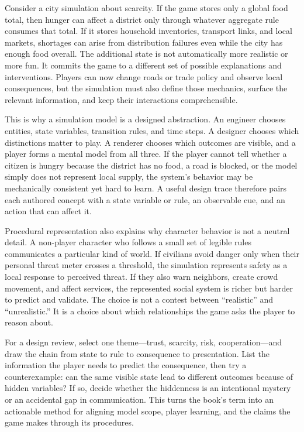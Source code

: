 Consider a city simulation about scarcity. If the game stores only a global food total, then hunger can affect a district only through whatever aggregate rule consumes that total. If it stores household inventories, transport links, and local markets, shortages can arise from distribution failures even while the city has enough food overall. The additional state is not automatically more realistic or more fun. It commits the game to a different set of possible explanations and interventions. Players can now change roads or trade policy and observe local consequences, but the simulation must also define those mechanics, surface the relevant information, and keep their interactions comprehensible.

This is why a simulation model is a designed abstraction. An engineer chooses entities, state variables, transition rules, and time steps. A designer chooses which distinctions matter to play. A renderer chooses which outcomes are visible, and a player forms a mental model from all three. If the player cannot tell whether a citizen is hungry because the district has no food, a road is blocked, or the model simply does not represent local supply, the system's behavior may be mechanically consistent yet hard to learn. A useful design trace therefore pairs each authored concept with a state variable or rule, an observable cue, and an action that can affect it.

Procedural representation also explains why character behavior is not a neutral detail. A non-player character who follows a small set of legible rules communicates a particular kind of world. If civilians avoid danger only when their personal threat meter crosses a threshold, the simulation represents safety as a local response to perceived threat. If they also warn neighbors, create crowd movement, and affect services, the represented social system is richer but harder to predict and validate. The choice is not a contest between ``realistic'' and ``unrealistic.'' It is a choice about which relationships the game asks the player to reason about.

For a design review, select one theme---trust, scarcity, risk, cooperation---and draw the chain from state to rule to consequence to presentation. List the information the player needs to predict the consequence, then try a counterexample: can the same visible state lead to different outcomes because of hidden variables? If so, decide whether the hiddenness is an intentional mystery or an accidental gap in communication. This turns the book's term into an actionable method for aligning model scope, player learning, and the claims the game makes through its procedures.

